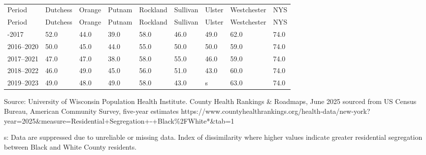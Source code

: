 \documentclass[
  english,
  letterpaper,
]{report}
\begin{document}
\begin{longtable}[]{@{}lllllllll@{}}

\caption{\label{tbl-residential-segregation}Index Score of Residential
Segregation, 2013--2023}

\tabularnewline

\caption{}\label{T_e926d}\tabularnewline
\toprule\noalign{}
Period & Dutchess & Orange & Putnam & Rockland & Sullivan & Ulster &
Westchester & NYS \\
\midrule\noalign{}
\endfirsthead
\toprule\noalign{}
Period & Dutchess & Orange & Putnam & Rockland & Sullivan & Ulster &
Westchester & NYS \\
\midrule\noalign{}
\endhead
\bottomrule\noalign{}
\endlastfoot
2013-2017 & 52.0 & 44.0 & 39.0 & 58.0 & 46.0 & 49.0 & 62.0 & 74.0 \\
2016--2020 & 50.0 & 45.0 & 44.0 & 55.0 & 50.0 & 50.0 & 59.0 & 74.0 \\
2017--2021 & 47.0 & 47.0 & 38.0 & 58.0 & 55.0 & 46.0 & 59.0 & 74.0 \\
2018--2022 & 46.0 & 49.0 & 45.0 & 56.0 & 51.0 & 43.0 & 60.0 & 74.0 \\
2019--2023 & 49.0 & 48.0 & 49.0 & 58.0 & 43.0 & s & 63.0 & 74.0 \\

\end{longtable}

\begin{tcolorbox}[enhanced jigsaw, breakable, leftrule=.75mm, title=\textcolor{quarto-callout-note-color}{\faInfo}\hspace{0.5em}{Source}, bottomrule=.15mm, opacityback=0, left=2mm, colback=white, bottomtitle=1mm, coltitle=black, colbacktitle=quarto-callout-note-color!10!white, colframe=quarto-callout-note-color-frame, opacitybacktitle=0.6, toptitle=1mm, titlerule=0mm, arc=.35mm, rightrule=.15mm, toprule=.15mm]

Source: University of Wisconsin Population Health Institute. County
Health Rankings \& Roadmaps, June 2025 sourced from US Census Bureau,
American Community Survey, five-year estimates
https://www.countyhealthrankings.org/health-data/new-york?year=2025\&measure=Residential+Segregation+-+Black\%2FWhite*\&tab=1

\end{tcolorbox}

\begin{tcolorbox}[enhanced jigsaw, breakable, leftrule=.75mm, title=\textcolor{quarto-callout-note-color}{\faInfo}\hspace{0.5em}{Note}, bottomrule=.15mm, opacityback=0, left=2mm, colback=white, bottomtitle=1mm, coltitle=black, colbacktitle=quarto-callout-note-color!10!white, colframe=quarto-callout-note-color-frame, opacitybacktitle=0.6, toptitle=1mm, titlerule=0mm, arc=.35mm, rightrule=.15mm, toprule=.15mm]

s: Data are suppressed due to unreliable or missing data. Index of
dissimilarity where higher values indicate greater residential
segregation between Black and White County residents.

\end{tcolorbox}
\end{document}
